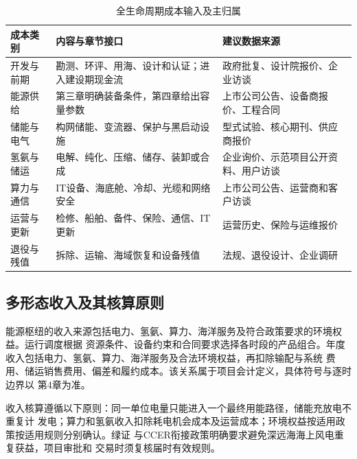 \begin{table}[H]
\centering
\caption{全生命周期成本输入及主归属}
\label{tab:c6-cost-boundary}
\small
\begin{tabularx}{\textwidth}{p{2.3cm} X X}
\toprule
成本类别 & 内容与章节接口 & 建议数据来源\\
\midrule
开发与前期 & 勘测、环评、用海、设计和认证；进入建设期现金流 & 政府批复、设计院报价、企业访谈\\
能源供给 & 第三章明确装备条件，第四章给出容量参数 & 上市公司公告、设备商报价、工程合同\\
储能与电气 & 构网储能、变流器、保护与黑启动设施 & 型式试验、核心期刊、供应商报价\\
氢氨与储运 & 电解、纯化、压缩、储存、装卸或合成 & 企业询价、示范项目公开资料、用户访谈\\
算力与通信 & IT设备、海底舱、冷却、光缆和网络安全 & 上市公司公告、运营商和客户访谈\\
运营与更新 & 检修、船舶、备件、保险、通信、IT更新 & 运营历史、保险与运维报价\\
退役与残值 & 拆除、运输、海域恢复和设备残值 & 法规、退役设计、企业调研\\
\bottomrule
\end{tabularx}
\end{table}

\subsection{多形态收入及其核算原则}

能源枢纽的收入来源包括电力、氢氨、算力、海洋服务及符合政策要求的环境权益。运行调度根据
资源条件、设备约束和合同要求选择各时段的产品组合。年度收入包括电力、氢氨、算力、海洋服务及合法环境权益，再扣除输配与系统
费用、储运销售费用、偏差和履约成本。该关系属于项目会计定义，具体符号与逐时边界以
第4章为准。

收入核算遵循以下原则：同一单位电量只能进入一个最终用能路径，储能充放电不重复计
发电；算力和氢氨收入扣除耗电机会成本及运营成本；环境权益按适用政策按适用规则分别确认。绿证
与CCER衔接政策明确要求避免深远海海上风电重复获益\cite{green-cert-ccer}，项目审批和
交易时须复核届时有效规则。

